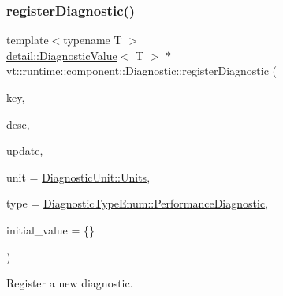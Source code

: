 \subsubsection{\texorpdfstring{register\+Diagnostic()}{registerDiagnostic()}}
{\footnotesize\ttfamily template$<$typename T $>$ \\
\hyperlink{structvt_1_1runtime_1_1component_1_1detail_1_1_diagnostic_value}{detail\+::\+Diagnostic\+Value}$<$ T $>$ $\ast$ vt\+::runtime\+::component\+::\+Diagnostic\+::register\+Diagnostic (\begin{DoxyParamCaption}\item[{std\+::string const \&}]{key,  }\item[{std\+::string const \&}]{desc,  }\item[{\hyperlink{namespacevt_1_1runtime_1_1component_a896637e6e183a909a17bfd8d3943c206}{Diagnostic\+Update}}]{update,  }\item[{\hyperlink{namespacevt_1_1runtime_1_1component_a99ec18b08862c712176126bb7d0e307a}{Diagnostic\+Unit}}]{unit = {\ttfamily \hyperlink{namespacevt_1_1runtime_1_1component_a99ec18b08862c712176126bb7d0e307aae5771a362d88a71a657bfcd21ca54b3f}{Diagnostic\+Unit\+::\+Units}},  }\item[{\hyperlink{namespacevt_1_1runtime_1_1component_af0bb99d9a054682217874bdc735ecac0}{Diagnostic\+Type\+Enum}}]{type = {\ttfamily \hyperlink{namespacevt_1_1runtime_1_1component_af0bb99d9a054682217874bdc735ecac0ab95e46074ff803c7a6f7107c2c1d382c}{Diagnostic\+Type\+Enum\+::\+Performance\+Diagnostic}},  }\item[{T}]{initial\+\_\+value = {\ttfamily \{\}} }\end{DoxyParamCaption})\hspace{0.3cm}{\ttfamily [protected]}}



Register a new diagnostic. 



